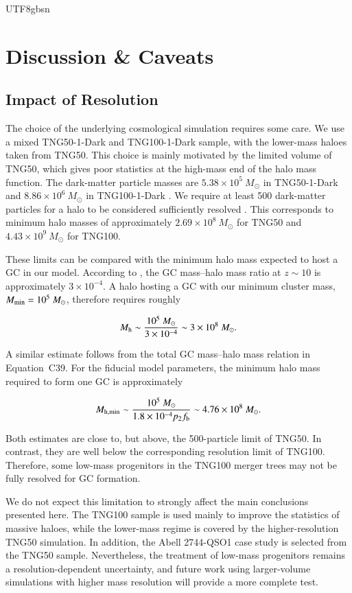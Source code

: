 \documentclass[trackchanges, twocolappendix, twocolumn]{aastex701}
\begin{document}
\begin{CJK*}{UTF8}{gbsn}
\section{Discussion \& Caveats} \label{sect:discuss}

\subsection{Impact of Resolution} \label{subsect:resolution}

The choice of the underlying cosmological simulation requires some care. We use a mixed TNG50-1-Dark and TNG100-1-Dark sample, with the lower-mass haloes taken from TNG50. This choice is mainly motivated by the limited volume of TNG50, which gives poor statistics at the high-mass end of the halo mass function. The dark-matter particle masses are \(5.38\times10^5~M_\odot\) in TNG50-1-Dark and \(8.86\times10^6~M_\odot\) in TNG100-1-Dark \citep{Springel+2018TNG}. We require at least 500 dark-matter particles for a halo to be considered sufficiently resolved \citep{Naoz+2009DM,Trenti+2010DM,Chen&Gnedin2023GC}. This corresponds to minimum halo masses of approximately \(2.69\times10^8~M_\odot\) for TNG50 and \(4.43\times10^9~M_\odot\) for TNG100.

These limits can be compared with the minimum halo mass expected to host a GC in our model. According to \citet{Choksi&Gnedin2019GC}, the GC mass--halo mass ratio at \(z\sim10\) is approximately \(3\times10^{-4}\). A halo hosting a GC with our minimum cluster mass, \(M_{\rm min}=10^5~M_\odot\), therefore requires roughly

$$
M_{\rm h}\sim \frac{10^5~M_\odot}{3\times10^{-4}}
\sim3\times10^8~M_\odot.
$$

A similar estimate follows from the total GC mass--halo mass relation in Equation~C39. For the fiducial model parameters, the minimum halo mass required to form one GC is approximately

$$
M_{\rm h,min}\sim
\frac{10^5~M_\odot}
{1.8\times10^{-4}p_2f_{\rm b}}
\sim4.76\times10^8~M_\odot.
$$

Both estimates are close to, but above, the 500-particle limit of TNG50. In contrast, they are well below the corresponding resolution limit of TNG100. Therefore, some low-mass progenitors in the TNG100 merger trees may not be fully resolved for GC formation.

We do not expect this limitation to strongly affect the main conclusions presented here. The TNG100 sample is used mainly to improve the statistics of massive haloes, while the lower-mass regime is covered by the higher-resolution TNG50 simulation. In addition, the Abell 2744-QSO1 case study is selected from the TNG50 sample. Nevertheless, the treatment of low-mass progenitors remains a resolution-dependent uncertainty, and future work using larger-volume simulations with higher mass resolution will provide a more complete test.


\end{CJK*}
\end{document}
